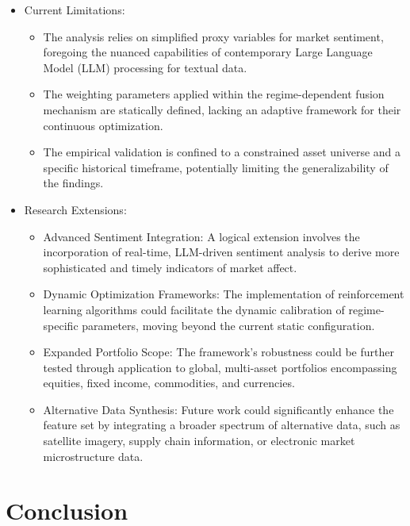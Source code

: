 \documentclass{singlecol-new}
\theoremstyle{TH}{
\newtheorem{lemma}{Lemma}
\newtheorem{theorem}[lemma]{Theorem}
\newtheorem{corrolary}[lemma]{Corrolary}
\newtheorem{conjecture}[lemma]{Conjecture}
\newtheorem{proposition}[lemma]{Proposition}
\newtheorem{claim}[lemma]{Claim}
\newtheorem{stheorem}[lemma]{Wrong Theorem}
\newtheorem{algorithm}{Algorithm}
}
\theoremstyle{THrm}{
\newtheorem{definition}{Definition}[section]
\newtheorem{question}{Question}[section]
\newtheorem{remark}{Remark}
\newtheorem{scheme}{Scheme}
}
\theoremstyle{THhit}{
\newtheorem{case}{Case}[section]
}
\begin{document}
\begin{itemize}
    \item Current Limitations:
    \begin{itemize}
        \item The analysis relies on simplified proxy variables for market sentiment, foregoing the nuanced capabilities of contemporary Large Language Model (LLM) processing for textual data.
        \item The weighting parameters applied within the regime-dependent fusion mechanism are statically defined, lacking an adaptive framework for their continuous optimization.
        \item The empirical validation is confined to a constrained asset universe and a specific historical timeframe, potentially limiting the generalizability of the findings.
    \end{itemize}
        
    \item Research Extensions:
    \begin{itemize}
        \item Advanced Sentiment Integration: A logical extension involves the incorporation of real-time, LLM-driven sentiment analysis to derive more sophisticated and timely indicators of market affect.
        \item Dynamic Optimization Frameworks: The implementation of reinforcement learning algorithms could facilitate the dynamic calibration of regime-specific parameters, moving beyond the current static configuration.
        \item  Expanded Portfolio Scope: The framework's robustness could be further tested through application to global, multi-asset portfolios encompassing equities, fixed income, commodities, and currencies.
        \item Alternative Data Synthesis: Future work could significantly enhance the feature set by integrating a broader spectrum of alternative data, such as satellite imagery, supply chain information, or electronic market microstructure data.
    \end{itemize}       
\end{itemize}



\section{Conclusion}
\end{document}
